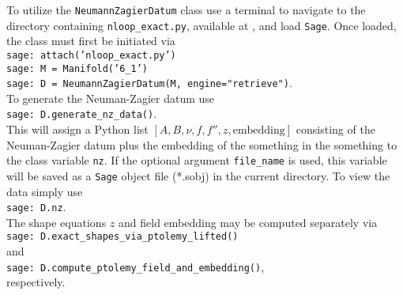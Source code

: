 \documentclass[12pt]{amsart}
\theoremstyle{definition}
\begin{document}
To utilize the \texttt{NeumannZagierDatum} class use a terminal to navigate to
the directory containing \texttt{nloop\_exact.py}, available at 
\cite{nloop-compute}, and load \texttt{Sage}. Once loaded, the class must 
first be initiated via\\
\indent \texttt{sage: attach('nloop\_exact.py')\\
\indent	     sage: M = Manifold('6\_1')\\
\indent	     sage: D = NeumannZagierDatum(M, engine="retrieve")}.\\
To generate the Neuman-Zagier datum use\\
\indent \texttt{sage: D.generate\_nz\_data()}.\\
This will assign a Python list $[A,B,\nu,f,f'',z, \text{embedding}]$ consisting of
the Neuman-Zagier datum plus the embedding of the something in the
something to the class variable \texttt{nz}. If the optional argument
\texttt{file\_name} is used, this variable will be saved as a \texttt{Sage} object
file (*.sobj) in the current directory. To view the data simply use\\
\indent \texttt{sage: D.nz}.\\
The shape equations $z$ and field embedding may be computed separately
via\\
\indent \texttt{sage: D.exact\_shapes\_via\_ptolemy\_lifted()}\\
and\\
\indent \texttt{sage: D.compute\_ptolemy\_field\_and\_embedding()},\\
respectively.
\end{document}
